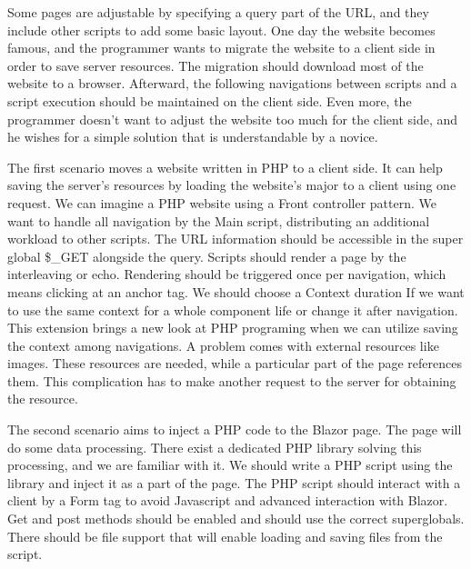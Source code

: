Some pages are adjustable by specifying a query part of the URL, and they include other scripts to add some basic layout.
One day the website becomes famous, and the programmer wants to migrate the website to a client side in order to save server resources.
The migration should download most of the website to a browser.
Afterward, the following navigations between scripts and a script execution should be maintained on the client side.
Even more, the programmer doesn't want to adjust the website too much for the client side, and he wishes for a simple solution that is understandable by a novice.
\par
{}
The first scenario moves a website written in PHP to a client side.
It can help saving the server's resources by loading the website's major to a client using one request.
We can imagine a PHP website using a Front controller pattern.
We want to handle all navigation by the Main script, distributing an additional workload to other scripts.
The URL information should be accessible in the super global \$\_GET alongside the query.
Scripts should render a page by the interleaving or echo.
Rendering should be triggered once per navigation, which means clicking at an anchor tag.
We should choose a Context duration If we want to use the same context for a whole component life or change it after navigation.
This extension brings a new look at PHP programing when we can utilize saving the context among navigations.
A problem comes with external resources like images.
These resources are needed, while a particular part of the page references them.
This complication has to make another request to the server for obtaining the resource.
\par
The second scenario aims to inject a PHP code to the Blazor page.
The page will do some data processing.
There exist a dedicated PHP library solving this processing, and we are familiar with it.
We should write a PHP script using the library and inject it as a part of the page.
The PHP script should interact with a client by a Form tag to avoid Javascript and advanced interaction with Blazor.
Get and post methods should be enabled and should use the correct superglobals.
There should be file support that will enable loading and saving files from the script.
